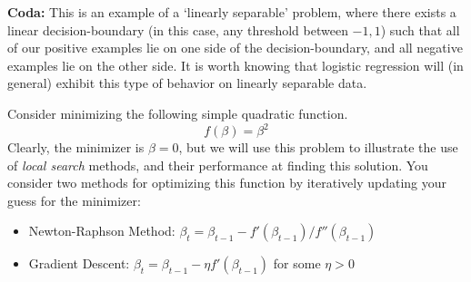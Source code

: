 \documentclass[11pt,addpoints,answers]{exam}
\begin{document}
\begin{questions}
\begin{parts}
\end{parts}
\textbf{Coda:} This is an example of a `linearly separable' problem, where there exists a linear decision-boundary (in this case, any threshold between $-1, 1$) such that all of our positive examples lie on one side of the decision-boundary, and all negative examples lie on the other side.  It is worth knowing that logistic regression will (in general) exhibit this type of behavior on linearly separable data.

\newpage
\question%
Consider minimizing the following simple quadratic function.
\begin{equation*}
f(\beta) = \beta^2
\end{equation*}
Clearly, the minimizer is $\beta = 0$, but we will use this problem to illustrate the use of \textit{local search} methods, and their performance at finding this solution. You consider two methods for optimizing this function by iteratively updating your guess for the minimizer:
\begin{itemize}
  \item Newton-Raphson Method: $\beta_t = \beta_{t-1} - f'(\beta_{t-1}) / f''(\beta_{t-1})$
  \item Gradient Descent: $\beta_t = \beta_{t-1} - \eta f'(\beta_{t-1})$ for some $\eta > 0$
\end{itemize}

\end{questions}
\end{document}
